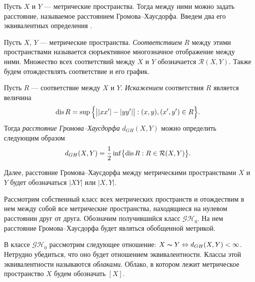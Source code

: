 Пусть $X$ и $Y$ ---
метрические пространства. Тогда между ними можно задать расстояние, называемое
расстоянием Громова--Хаусдорфа. Введем два его эквивалентных
определения \cite{Lectures}.
\begin{defin}
  Пусть $X$, $Y$ --- метрические пространства. \emph{Соответствием}
  $R$ между этими пространствами
  называется сюръективное многозначное отображение между ними.
  Множество всех соответствий между $X$ и $Y$ обозначается
  $\mathcal{R}(X,Y)$. Также будем отождествлять соответствие и его график.
\end{defin}
\begin{defin}
  Пусть $R$ --- соответствие между $X$ и $Y$.
  \emph{Искажением} соответствия $R$ является величина
  $$ \operatorname{dis}{R} = \sup{\Bigl\{ \big| |xx'| - |yy'| \big| : (x, y), (x',
  y') \in R\Bigr\}}.$$
  Тогда \emph{расстояние Громова--Хаусдорфа} $d_{GH}(X,Y)$ можно определить
  следующим образом
  $$ d_{GH}(X,Y) = \frac{1}{2}\inf \bigl\{\operatorname{dis}{R} : R \in
  \mathcal{R}(X,Y)\bigr\}.$$
  \label{defSootvet}
\end{defin}

Далее, расстояние Громова--Хаусдорфа между метрическими
пространствами $X$ и $Y$ будет обозначаться $|XY|$ или \( | X,Y | \).

Рассмотрим собственный класс всех метрических пространств и
отождествим в нем между собой все метрические пространства,
находящиеся на нулевом расстоянии друг от друга. Обозначим
получившийся класс $\mathcal{GH}_0$.  На нем расстояние
Громова--Хаусдорфа будет являться обобщенной метрикой.
\begin{defin} В классе $\mathcal{GH}_{0}$ рассмотрим следующее
  отношение: $X \thicksim Y \Leftrightarrow d_{GH}(X, Y) < \infty$. Нетрудно
  убедиться, что оно будет отношением эквивалентности. Классы этой
  эквивалентности
  называются \emph{облаками}. Облако, в котором лежит метрическое
  пространство $X$
  будем обозначать $[X]$.
\end{defin}

